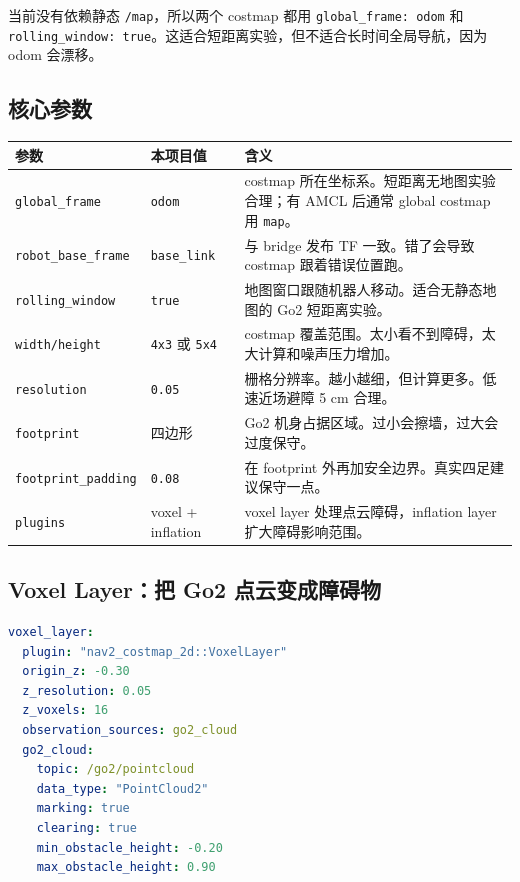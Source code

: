 \documentclass[UTF8,11pt,a4paper,openany]{ctexrep}
\newcommand{\code}[1]{\nolinkurl{#1}}
\newcommand{\topic}[1]{\nolinkurl{#1}}
\newcommand{\param}[1]{\nolinkurl{#1}}
\begin{document}
当前没有依赖静态 \topic{/map}，所以两个 costmap 都用 \param{global_frame: odom} 和 \param{rolling_window: true}。这适合短距离实验，但不适合长时间全局导航，因为 odom 会漂移。

\subsection{核心参数}

\begin{longtable}{L{0.25\textwidth}L{0.22\textwidth}L{0.43\textwidth}}
\toprule
参数 & 本项目值 & 含义 \\
\midrule
\param{global_frame} & \code{odom} & costmap 所在坐标系。短距离无地图实验合理；有 AMCL 后通常 global costmap 用 \code{map}。 \\
\param{robot_base_frame} & \code{base_link} & 与 bridge 发布 TF 一致。错了会导致 costmap 跟着错误位置跑。 \\
\param{rolling_window} & \code{true} & 地图窗口跟随机器人移动。适合无静态地图的 Go2 短距离实验。 \\
\param{width/height} & \code{4x3} 或 \code{5x4} & costmap 覆盖范围。太小看不到障碍，太大计算和噪声压力增加。 \\
\param{resolution} & \code{0.05} & 栅格分辨率。越小越细，但计算更多。低速近场避障 5 cm 合理。 \\
\param{footprint} & 四边形 & Go2 机身占据区域。过小会擦墙，过大会过度保守。 \\
\param{footprint_padding} & \code{0.08} & 在 footprint 外再加安全边界。真实四足建议保守一点。 \\
\param{plugins} & voxel + inflation & voxel layer 处理点云障碍，inflation layer 扩大障碍影响范围。 \\
\bottomrule
\end{longtable}

\subsection{Voxel Layer：把 Go2 点云变成障碍物}

\begin{lstlisting}[language=yaml]
voxel_layer:
  plugin: "nav2_costmap_2d::VoxelLayer"
  origin_z: -0.30
  z_resolution: 0.05
  z_voxels: 16
  observation_sources: go2_cloud
  go2_cloud:
    topic: /go2/pointcloud
    data_type: "PointCloud2"
    marking: true
    clearing: true
    min_obstacle_height: -0.20
    max_obstacle_height: 0.90
\end{lstlisting}
\end{document}
